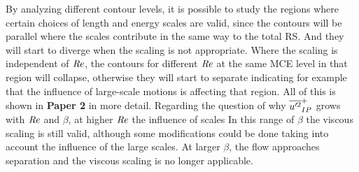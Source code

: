 By analyzing different contour levels, it is possible to study the regions where certain choices of length and energy scales are valid, since the contours will be parallel where the scales contribute in the same way to the total RS. And they will start to diverge when the scaling is not appropriate.
Where the scaling is independent of $\mbox{\textit{Re}}$, the contours for different $\mbox{\textit{Re}}$ at the same MCE level in that region will collapse, otherwise they will start to separate indicating for example that the influence of large-scale motions is affecting that region.
All of this is shown in \textbf{Paper 2} in more detail.
Regarding the question of why $\overline{u^{\prime}\mkern-1.2mu ^2}_{IP}^+$ grows with $\mbox{\textit{Re}}$ and $\beta$, at higher $\mbox{\textit{Re}}$ the influence of scales 
In this range of $\beta$ the viscous scaling is still valid, although some modifications could be done taking into account the influence of the large scales.
At larger $\beta$, the flow approaches separation and the viscous scaling is no longer applicable.

